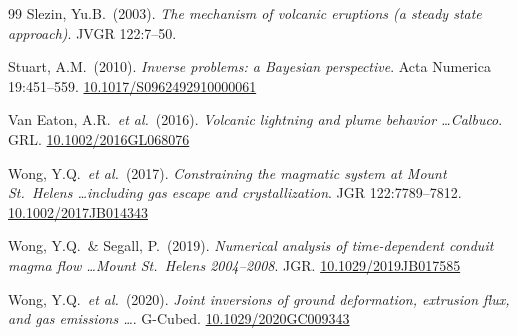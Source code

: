 \documentclass[11pt,a4paper]{article}
\theoremstyle{plain}
\theoremstyle{definition}
\theoremstyle{remark}
\begin{document}
\begin{thebibliography}{99}
 Slezin, Yu.B.\ (2003).
  \emph{The mechanism of volcanic eruptions (a steady state approach)}.
  JVGR 122:7--50.

 Stuart, A.M.\ (2010).
  \emph{Inverse problems: a Bayesian perspective}.
  Acta Numerica 19:451--559.
  \href{https://doi.org/10.1017/S0962492910000061}{10.1017/S0962492910000061}

 Van Eaton, A.R.\ \emph{et al.}\ (2016).
  \emph{Volcanic lightning and plume behavior \ldots Calbuco}.
  GRL.
  \href{https://doi.org/10.1002/2016GL068076}{10.1002/2016GL068076}

 Wong, Y.Q.\ \emph{et al.}\ (2017).
  \emph{Constraining the magmatic system at Mount St.\ Helens
  \ldots including gas escape and crystallization}. JGR 122:7789--7812.
  \href{https://doi.org/10.1002/2017JB014343}{10.1002/2017JB014343}

 Wong, Y.Q.\ \& Segall, P.\ (2019).
  \emph{Numerical analysis of time-dependent conduit magma flow
  \ldots Mount St.\ Helens 2004--2008}. JGR.
  \href{https://doi.org/10.1029/2019JB017585}{10.1029/2019JB017585}

 Wong, Y.Q.\ \emph{et al.}\ (2020).
  \emph{Joint inversions of ground deformation, extrusion flux,
  and gas emissions \ldots}. G-Cubed.
  \href{https://doi.org/10.1029/2020GC009343}{10.1029/2020GC009343}

\end{thebibliography}
\end{document}
